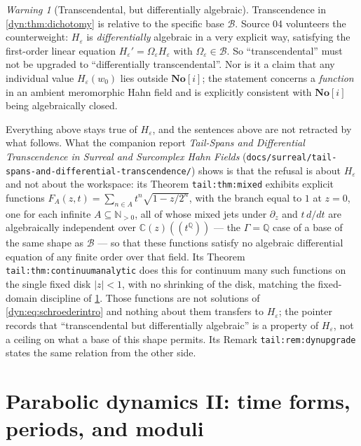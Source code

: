 \documentclass[11pt,letterpaper]{article}
\theoremstyle{definition}
\theoremstyle{remark}
\newtheorem{warning}[warning]{Warning}
\newcommand{\C}{\mathbb C}
\newcommand{\Q}{\mathbb Q}
\newcommand{\N}{\mathbb N}
\newcommand{\No}{\mathbf{No}}
\newcommand{\BB}{\mathscr B}
\newcommand{\eps}{\varepsilon}
\numberwithin{equation}{section}
\begin{document}
\begin{warning}[Transcendental, but differentially algebraic]
\label{dyn:warn:diffalg}
Transcendence in \cref{dyn:thm:dichotomy} is relative to the specific base
$\BB$. Source 04 volunteers the counterweight: $H_\eps$ is
\emph{differentially} algebraic in a very explicit way, satisfying the
first-order linear equation $H_\eps'=\Omega_\eps H_\eps$ with
$\Omega_\eps\in\BB$. So ``transcendental'' must not be upgraded to
``differentially transcendental''. Nor is it a claim that any individual
value $H_\eps(w_0)$ lies outside $\No[i]$; the statement concerns a
\emph{function} in an ambient meromorphic Hahn field and is explicitly
consistent with $\No[i]$ being algebraically closed.

Everything above stays true of $H_\eps$, and the sentences above are not
retracted by what follows. What the companion report \emph{Tail-Spans and
Differential Transcendence in Surreal and Surcomplex Hahn Fields}
(\texttt{docs/surreal/tail-spans-and-differential-transcendence/}) shows is
that the refusal is about $H_\eps$ and not about the workspace: its
Theorem \texttt{tail:thm:mixed} exhibits explicit functions
$F_A(z,t)=\sum_{n\in A}t^{n}\sqrt{1-z/2^{n}}$, with the branch equal to
$1$ at $z=0$, one for each infinite $A\subseteq\N_{>0}$, all of whose
mixed jets under $\partial_z$ and $t\,d/dt$ are algebraically independent
over $\C(z)((t^{\Q}))$ --- the $\Gamma=\Q$ case of a base of the same
shape as $\BB$ --- so that these functions satisfy no algebraic
differential equation of any finite order over that field.
Its Theorem \texttt{tail:thm:continuumanalytic} does this for continuum
many such functions on the single fixed disk $|z|<1$, with no shrinking
of the disk, matching the fixed-domain discipline of
\cref{dyn:sec:periods}. Those functions are not solutions of
\cref{dyn:eq:schroederintro} and nothing about them transfers to
$H_\eps$; the pointer records that ``transcendental but differentially
algebraic'' is a property of $H_\eps$, not a ceiling on what a base of
this shape permits. Its Remark \texttt{tail:rem:dynupgrade} states
the same relation from the other side.
\end{warning}

\section{Parabolic dynamics II: time forms, periods, and moduli}
\label{dyn:sec:periods}
\end{document}
